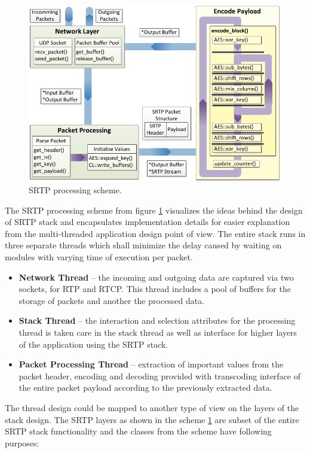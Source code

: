 \begin{figure}[h!]
\centering
\includegraphics[width=14cm]{fig/paral_scheme.pdf}
\caption[SRTP processing scheme]{SRTP processing scheme.}
\label{scheme}
\end{figure}

The SRTP processing scheme from figure \ref{scheme} visualizes the ideas behind
the design of SRTP stack and encapsulates implementation details for easier
explanation from the multi-threaded application design point of view. 
The entire stack runs in three separate threads which shall minimize the delay 
caused by waiting on modules with varying time of execution per packet.
\begin{itemize}
\item \textbf{Network Thread} -- the incoming and outgoing data are captured
via two sockets, for RTP and RTCP. This thread includes a pool of buffers for
the storage of packets and another the processed data.
\item \textbf{Stack Thread} -- the interaction and selection attributes for
the processing thread is taken care in the stack thread as well as interface
for higher layers of the application using the SRTP stack.
\item \textbf{Packet Processing Thread} -- extraction of important values from
the packet header, encoding and decoding provided with transcoding interface of 
the entire packet payload according to the previously extracted data.
\end{itemize} 

The thread design could be mapped to another type of view on the layers of
the stack design. The SRTP layers as shown in the scheme \ref{scheme} are subset
of the entire SRTP stack functionality and the classes from the scheme have 
following purposes:

